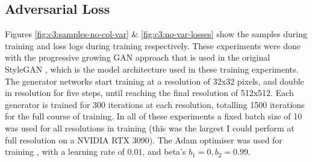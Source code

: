 \subsection{Adversarial Loss}

\label{c3:sec:adv-loss}

Figures \ref{fig:c3:samples-no-col-var} \& \ref{fig:c3:no-var-losses} show the samples during training and loss logs during training respectively.
These experiments were done with the progressive growing GAN approach \citep{karras2017progressive} that is used in the original StyleGAN \citep{karras2019style}, which is the model architecture used in these training experiments.
The generator networks start training at a resolution of 32x32 pixels, and double in resolution for five steps, until reaching the final resolution of 512x512. 
Each generator is trained for 300 iterations at each resolution, totalling 1500 iterations for the full course of training.
In all of these experiments a fixed batch size of 10 was used for all resolutions in training (this was the largest I could perform at full resolution on a NVIDIA RTX 3090). 
The Adam optimiser was used for training \citep{kingma2014adam}, with a learning rate of $0.01$, and beta's $b_{1} = 0, b_{2} = 0.99$.



